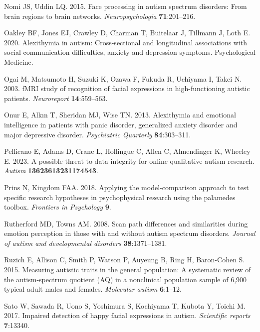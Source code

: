 \documentclass[
]{article}
\newlength{\cslhangindent}
\newlength{\cslentryspacingunit} %
\newenvironment{CSLReferences}[2] %
 {%
  \setlength{\parindent}{0pt}
  \ifodd #1
  \let\oldpar\par
  \def\par{\hangindent=\cslhangindent\oldpar}
  \fi
  \setlength{\parskip}{#2\cslentryspacingunit}
 }%
 {}
\begin{document}
\begin{CSLReferences}{1}{0}
\leavevmode{}%
Nomi JS, Uddin LQ. 2015. Face processing in autism spectrum disorders: From brain regions to brain networks. \emph{Neuropsychologia} \textbf{71}:201--216.

\leavevmode{}%
Oakley BF, Jones EJ, Crawley D, Charman T, Buitelaar J, Tillmann J, Loth E. 2020. Alexithymia in autism: Cross-sectional and longitudinal associations with social-communication difficulties, anxiety and depression symptoms. Psychological Medicine.

\leavevmode{}%
Ogai M, Matsumoto H, Suzuki K, Ozawa F, Fukuda R, Uchiyama I, Takei N. 2003. fMRI study of recognition of facial expressions in high-functioning autistic patients. \emph{Neuroreport} \textbf{14}:559--563.

\leavevmode{}%
Onur E, Alkın T, Sheridan MJ, Wise TN. 2013. Alexithymia and emotional intelligence in patients with panic disorder, generalized anxiety disorder and major depressive disorder. \emph{Psychiatric Quarterly} \textbf{84}:303--311.

\leavevmode{}%
Pellicano E, Adams D, Crane L, Hollingue C, Allen C, Almendinger K, Wheeley E. 2023. A possible threat to data integrity for online qualitative autism research. \emph{Autism} \textbf{13623613231174543}.

\leavevmode{}%
Prins N, Kingdom FAA. 2018. Applying the model-comparison approach to test specific research hypotheses in psychophysical research using the palamedes toolbox. \emph{Frontiers in Psychology} \textbf{9}.

\leavevmode{}%
Rutherford MD, Towns AM. 2008. Scan path differences and similarities during emotion perception in those with and without autism spectrum disorders. \emph{Journal of autism and developmental disorders} \textbf{38}:1371--1381.

\leavevmode{}%
Ruzich E, Allison C, Smith P, Watson P, Auyeung B, Ring H, Baron-Cohen S. 2015. Measuring autistic traits in the general population: A systematic review of the autism-spectrum quotient (AQ) in a nonclinical population sample of 6,900 typical adult males and females. \emph{Molecular autism} \textbf{6}:1--12.

\leavevmode{}%
Sato W, Sawada R, Uono S, Yoshimura S, Kochiyama T, Kubota Y, Toichi M. 2017. Impaired detection of happy facial expressions in autism. \emph{Scientific reports} \textbf{7}:13340.


\end{CSLReferences}
\end{document}
